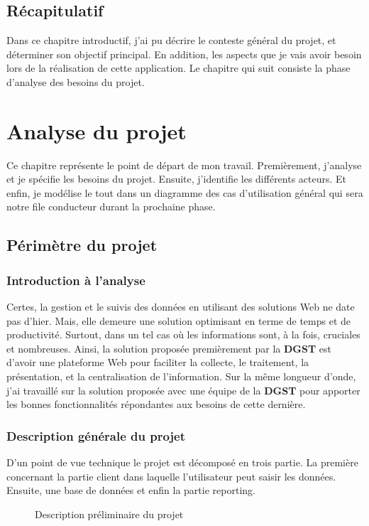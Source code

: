 \documentclass[a4paper]{report}
\begin{document}
\begin{doublespace}
	\section{Récapitulatif}
	Dans ce chapitre introductif, j'ai pu décrire le conteste général du
	projet, et
	déterminer son objectif principal. En addition, les aspects que je vais
	avoir besoin lors de la réalisation de cette application.
	Le chapitre qui suit consiste la phase d'analyse des besoins du projet.
	\newpage
	\chapter{Analyse du projet}
	\renewcommand{\headrulewidth}{1pt}
	\fancyhead[L]{\hspace*{5cm}}

	Ce chapitre représente le point de départ de mon travail. Premièrement,
	j'analyse et
	je spécifie les besoins du projet. Ensuite, j'identifie les différents
	acteurs. Et enfin, je
	modélise le tout dans un diagramme des cas d’utilisation général qui
	sera notre file conducteur
	durant la prochaine phase.
	\section{Périmètre du projet}
	\subsection{Introduction à l'analyse}
	Certes, la gestion et le suivis des données en utilisant des solutions
	Web ne date pas d'hier. Mais,
	elle demeure une solution optimisant en terme de temps et de
	productivité. Surtout,
	dans un tel cas où les informations sont, à la fois, cruciales et
	nombreuses. Ainsi, la solution proposée premièrement par la \textbf{DGST} est
	d'avoir une plateforme Web pour faciliter la collecte,
	le traitement, la présentation, et la centralisation de l'information.
	Sur la même longueur d'onde, j'ai
	travaillé sur la solution proposée avec une équipe de la \textbf{DGST}
	pour apporter les bonnes
	fonctionnalités répondantes aux besoins de cette dernière.
	\subsection{Description générale du projet}
	D'un point de vue technique le projet est décomposé en trois partie. La
	première concernant la partie client dans laquelle l'utilisateur peut saisir
	les données. Ensuite, une base de données et enfin la partie reporting.
	\begin{figure}[H]
		\begin{center}
			\caption{Description préliminaire du projet}
		\end{center}
	\end{figure}

\end{doublespace}
\end{document}
